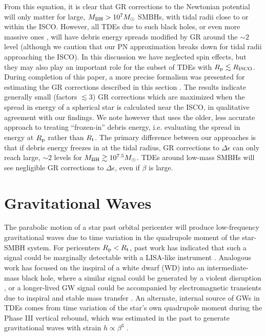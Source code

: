 \documentclass[useAMS, twocolumn, usenatbib]{mn2e}
\begin{document}
From this equation, it is clear that GR corrections to the Newtonian potential will only matter for large, $M_{\rm BH}>10^7 M_{\odot}$ SMBHs, with tidal radii close to or within the ISCO.  However, all TDEs due to such black holes, or even more massive ones \citep{Kesden11}, will have debris energy spreads modified by GR around the $\sim 2$ level (although we caution that our PN approximation breaks down for tidal radii approaching the ISCO).  In this discussion we have neglected spin effects, but they may also play an important role for the subset of TDEs with $R_{\rm p}\lesssim R_{\rm ISCO}$.  During completion of this paper, a more precise formalism was presented for estimating the GR corrections described in this section \citep{Kesden12}.  The results indicate generally small (factors $\lesssim 3$) GR corrections which are maximized when the spread in energy of a spherical star is calculated near the ISCO, in qualitative agreement with our findings.  We note however that \citet{Kesden12} uses the older, less accurate approach to treating ``frozen-in'' debris energy, i.e. evaluating the spread in energy at $R_{\rm p}$ rather than $R_{\rm t}$.  The primary difference between our approaches is that if debris energy freezes in at the tidal radius, GR corrections to $\Delta\epsilon$ can only reach large, $\sim 2$ levels for $M_{\rm BH} \gtrsim 10^{7.5}M_{\odot}$.  TDEs around low-mass SMBHs will see negligible GR corrections to $\Delta\epsilon$, even if $\beta$ is large.


\section{Gravitational Waves}
The parabolic motion of a star past orbital pericenter will produce low-frequency gravitational waves due to time variation in the quadrupole moment of the star-SMBH system.  For pericenters $R_{\rm p}<R_{\rm t}$, past work has indicated that such a signal could be marginally detectable with a LISA-like instrument \citep{Kobayashi+04}.  Analogous work has focused on the inspiral of a white dwarf (WD) into an intermediate-mass black hole, where a similar signal could be generated by a violent disruption \citep{RosswogRR09, Haas+12}, or a longer-lived GW signal could be accompanied by electromagnetic transients due to inspiral and stable mass transfer \citep{Zalamea+12}.  An alternate, internal source of GWs in TDEs comes from time variation of the star's own quadrupole moment during the Phase III vertical rebound, which was estimated in the past to generate gravitational waves with strain $h \propto \beta^3$ \citep{Guillochon+09}.
\end{document}
